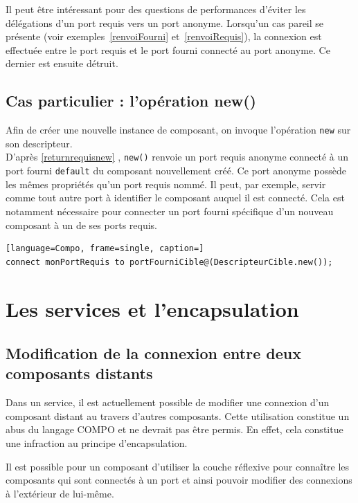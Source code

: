 \documentclass[11pt,a4paper,openany,oneside]{book}
\begin{document}
Il peut être intéressant pour des questions de performances d'éviter les délégations d'un port requis vers un port anonyme. Lorsqu'un cas pareil se présente (voir exemples~\ref{renvoiFourni} et~\ref{renvoiRequis}), la connexion est effectuée entre le port requis et le port fourni connecté au port anonyme. Ce dernier est ensuite détruit.

\subsection{Cas particulier : l'opération new()}
Afin de créer une nouvelle instance de composant, on invoque l'opération \texttt{new} sur son descripteur.\\
D'après \ref{returnrequisnew} , \texttt{new()} renvoie un port requis anonyme connecté à un port fourni \texttt{default} du composant nouvellement créé.
Ce port anonyme possède les mêmes propriétés qu'un port requis nommé. Il peut, par exemple, servir comme tout autre port à identifier le composant auquel il est connecté. Cela est notamment nécessaire pour connecter un port fourni spécifique d'un nouveau composant à un de ses ports requis. 

\begin{lstlisting}[language=Compo, frame=single, caption=]
connect monPortRequis to portFourniCible@(DescripteurCible.new());
\end{lstlisting}

\clearpage

\section{Les services et l'encapsulation}

\subsection{Modification de la connexion entre deux composants distants}
\label{serviceEncapsulationRef}
Dans un service, il est actuellement possible de modifier une connexion d'un composant distant au travers d'autres composants.
Cette utilisation constitue un abus du langage COMPO et ne devrait pas être permis. En effet, cela constitue une infraction au principe d'encapsulation. 

Il est possible pour un composant d'utiliser la couche réflexive pour connaître les composants qui sont connectés à un port et ainsi pouvoir modifier des connexions à l'extérieur de lui-même. 
\end{document}
